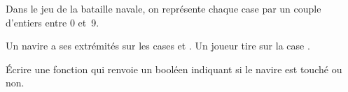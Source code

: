\question{} Dans le jeu de la bataille navale, on représente chaque case par un couple d'entiers entre 0 et~9.

Un navire a ses extrémités sur les cases  et . Un joueur tire sur la case . 

\'Ecrire une fonction  qui renvoie un booléen indiquant si le navire est touché ou non.